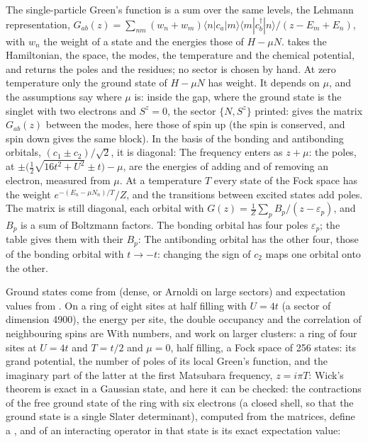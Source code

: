 \documentclass[11pt,a4paper]{article}
\begin{document}
The single-particle Green's function is a sum over the same levels, the Lehmann representation,
$G_{ab}(z)=\sum_{nm}(w_n+w_m)\langle n|c_a|m\rangle\langle m|c^\dagger_b|n\rangle/(z-E_m+E_n)$, with $w_n$ the weight of a state and the
energies those of $H-\mu N$.  takes the Hamiltonian, the space, the modes, the temperature and the chemical
potential, and returns the poles and the residues; no sector is chosen by hand. At zero temperature only the ground state of
$H-\mu N$ has weight. It depends on $\mu$, and the assumptions say where $\mu$ is: inside the gap, where the ground state is
the singlet with two electrons and $S^z=0$, the sector $\{N,S^z\}$ printed:
 gives the matrix $G_{ab}(z)$ between the modes, here those of spin up (the spin is conserved, and spin down
gives the same block). In the basis of the bonding and antibonding orbitals, $(c_1\pm c_2)/\sqrt2$, it is diagonal:
The frequency enters as $z+\mu$: the poles, at $\pm\big(\frac12\sqrt{16t^2+U^2}\pm t\big)-\mu$, are the energies of adding and of removing an
electron, measured from $\mu$. At a temperature $T$ every state of the Fock space has the weight $e^{-(E_n-\mu N_n)/T}/Z$, and
the transitions between excited states add poles. The matrix is still diagonal, each orbital with
$G(z)=\frac1Z\sum_pB_p/(z-\varepsilon_p)$, and $B_p$ is a sum of Boltzmann factors. The bonding orbital has four poles
$\varepsilon_p$; the table gives them with their $B_p$:
The antibonding orbital has the other four, those of the bonding orbital with $t\to-t$: changing the sign of $c_2$ maps one
orbital onto the other.

Ground states come from  (dense, or Arnoldi on large sectors) and expectation values from
. On a ring of eight sites at half filling with $U=4t$ (a sector of dimension 4900), the energy per
site, the double occupancy and the correlation of neighbouring spins are
With numbers,  and  work on larger clusters: a ring of four sites at $U=4t$ and
$T=t/2$ and $\mu=0$, half filling, a Fock space of 256 states: its grand potential, the number of poles of its local Green's function, and the
imaginary part of the latter at the first Matsubara frequency, $z=i\pi T$:
Wick's theorem is exact in a Gaussian state, and here it can be checked: the contractions of the free ground state of the
ring with six electrons (a closed shell, so that the ground state is a single Slater determinant), computed from the
matrices, define a , and  of an interacting operator in that state is its exact
expectation value:
\end{document}
